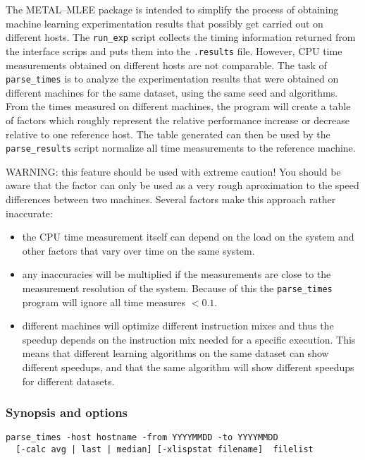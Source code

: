 \documentclass[a4paper,10pt,twoside]{article}
\newcommand{\eenameshort}{\textsf{METAL--MLEE}}
\begin{document}
The \eenameshort{} package is intended to simplify the process of
obtaining machine learning experimentation results that possibly
get carried out on different hosts. The \verb=run_exp= script
collects the timing information returned from the interface scrips and
puts them into the \verb=.results= file.
However, CPU time measurements obtained on different hosts are 
not comparable. The task of \verb=parse_times= is to analyze the
experimentation results that were obtained on different machines 
for the same dataset, using the same seed and algorithms.
From the times measured on different machines, the program will
create a table of factors which roughly represent the relative
performance increase or decrease relative to one reference host.
The table generated can then be used by the \verb=parse_results=
script normalize all time measurements to the reference machine.

WARNING: this feature should be used with extreme caution!
You should be aware that the factor can only be used as 
a very rough aproximation to the speed differences between 
two machines. Several factors make this approach rather 
inaccurate:

\begin{itemize}
\item the CPU time measurement itself can depend on the load on the system
and other factors that vary over time on the same system.
\item any inaccuracies will be multiplied if the measurements
are close to the measurement resolution of the system.
Because of this the \verb=parse_times= program will ignore all time
measures $< 0.1$. 
\item different machines will optimize different instruction mixes and
thus the speedup depends on the instruction mix needed for a specific
execution. This means that different learning algorithms on the same 
dataset can show different speedups, and that the same algorithm
will show different speedups for different datasets.
\end{itemize}

\subsubsection{Synopsis and options}

\begin{verbatim}
parse_times -host hostname -from YYYYMMDD -to YYYYMMDD
  [-calc avg | last | median] [-xlispstat filename]  filelist
\end{verbatim}
\end{document}
